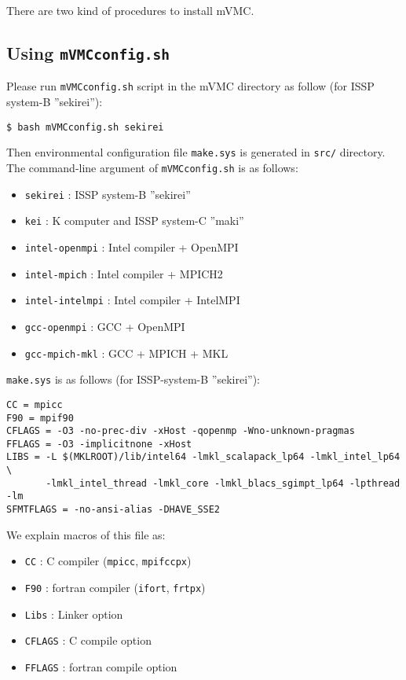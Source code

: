 There are two kind of procedures to install mVMC.

\subsection{Using \texttt{mVMCconfig.sh}}

Please run \verb|mVMCconfig.sh| script in the mVMC directory as follow
(for ISSP system-B ''sekirei''):
\begin{verbatim}
$ bash mVMCconfig.sh sekirei
\end{verbatim}
Then environmental configuration file \verb|make.sys| is generated in 
\verb|src/| directory.
The command-line argument of \verb|mVMCconfig.sh| is as follows:
\begin{itemize}
\item \verb|sekirei| : ISSP system-B ''sekirei''
\item \verb|kei| : K computer and ISSP system-C ''maki''
\item \verb|intel-openmpi| : Intel compiler + OpenMPI
\item \verb|intel-mpich| : Intel compiler + MPICH2
\item \verb|intel-intelmpi| : Intel compiler + IntelMPI
\item \verb|gcc-openmpi| : GCC + OpenMPI
\item \verb|gcc-mpich-mkl| : GCC + MPICH + MKL
\end{itemize}

\verb|make.sys| is as follows (for ISSP-system-B ''sekirei''):
\begin{verbatim}
CC = mpicc
F90 = mpif90
CFLAGS = -O3 -no-prec-div -xHost -qopenmp -Wno-unknown-pragmas
FFLAGS = -O3 -implicitnone -xHost
LIBS = -L $(MKLROOT)/lib/intel64 -lmkl_scalapack_lp64 -lmkl_intel_lp64 \
       -lmkl_intel_thread -lmkl_core -lmkl_blacs_sgimpt_lp64 -lpthread -lm
SFMTFLAGS = -no-ansi-alias -DHAVE_SSE2
\end{verbatim}
We explain macros of this file as: 
\begin{itemize}
\item \verb|CC| : C compiler (\verb|mpicc|, \verb|mpifccpx|)
\item \verb|F90| : fortran compiler (\verb|ifort|, \verb|frtpx|)
\item \verb|Libs| : Linker option
\item \verb|CFLAGS| : C compile option
\item \verb|FFLAGS| : fortran compile option
\end{itemize}



